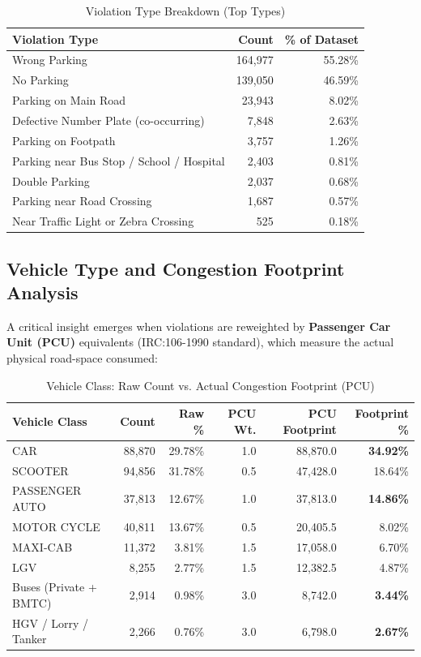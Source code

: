 \documentclass[12pt,a4paper]{article}
\begin{document}
\begin{table}[H]
\centering
\caption{Violation Type Breakdown (Top Types)}
\begin{tabular}{lrr}
\toprule
\textbf{Violation Type} & \textbf{Count} & \textbf{\% of Dataset} \\
\midrule
Wrong Parking & 164,977 & 55.28\% \\
No Parking & 139,050 & 46.59\% \\
Parking on Main Road & 23,943 & 8.02\% \\
Defective Number Plate (co-occurring) & 7,848 & 2.63\% \\
Parking on Footpath & 3,757 & 1.26\% \\
Parking near Bus Stop / School / Hospital & 2,403 & 0.81\% \\
Double Parking & 2,037 & 0.68\% \\
Parking near Road Crossing & 1,687 & 0.57\% \\
Near Traffic Light or Zebra Crossing & 525 & 0.18\% \\
\bottomrule
\end{tabular}
\end{table}

\subsection{Vehicle Type and Congestion Footprint Analysis}

A critical insight emerges when violations are reweighted by \textbf{Passenger Car Unit (PCU)} equivalents (IRC:106-1990 standard), which measure the actual physical road-space consumed:

\begin{table}[H]
\centering
\caption{Vehicle Class: Raw Count vs. Actual Congestion Footprint (PCU)}
\begin{tabular}{lrrrrr}
\toprule
\textbf{Vehicle Class} & \textbf{Count} & \textbf{Raw \%} & \textbf{PCU Wt.} & \textbf{PCU Footprint} & \textbf{Footprint \%} \\
\midrule
\rowcolor{blue!8} CAR & 88,870 & 29.78\% & 1.0 & 88,870.0 & \textbf{34.92\%} \\
SCOOTER & 94,856 & 31.78\% & 0.5 & 47,428.0 & 18.64\% \\
\rowcolor{blue!8} PASSENGER AUTO & 37,813 & 12.67\% & 1.0 & 37,813.0 & \textbf{14.86\%} \\
MOTOR CYCLE & 40,811 & 13.67\% & 0.5 & 20,405.5 & 8.02\% \\
MAXI-CAB & 11,372 & 3.81\% & 1.5 & 17,058.0 & 6.70\% \\
LGV & 8,255 & 2.77\% & 1.5 & 12,382.5 & 4.87\% \\
\rowcolor{alertred!10} Buses (Private + BMTC) & 2,914 & 0.98\% & 3.0 & 8,742.0 & \textbf{3.44\%} \\
\rowcolor{alertred!10} HGV / Lorry / Tanker & 2,266 & 0.76\% & 3.0 & 6,798.0 & \textbf{2.67\%} \\
\bottomrule
\end{tabular}
\end{table}
\end{document}
